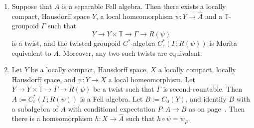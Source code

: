 \documentclass[12pt,a4paper]{amsart}
\newcommand{\field}[1]{\mathbb{#1}}
\newcommand{\TT}{\field{T}}
\newcommand{\red}{\operatorname{r}}
\newcommand{\tgcsa}[2]{\ensuremath{C^*_{\red}(#1 ; #2)}}
\begin{document}
\begin{thm}\label{thm-main}
\begin{enumerate}
\item  Suppose that $A$ is a separable Fell algebra.  Then
    there exists a locally compact, Hausdorff space $Y$, a
    local homeomorphism $\psi:Y\to\widehat A$ and a
    $\TT$-groupoid $\Gamma$ such that
    \[
    Y\to Y\times\TT\to\Gamma\to R(\psi)
    \]
is a twist, and the twisted groupoid  $C^*$-algebra
\tgcsa{\Gamma}{R(\psi)}  is Morita equivalent to  $A$.
Moreover, any two such twists are equivalent.
\item Let $Y$ be a locally compact, Hausdorff space, $X$ a
    locally compact, locally Hausdorff space, and $\psi:Y\to
    X$ a local homeomorphism. Let $Y\to Y \times \TT \to
    \Gamma \to R(\psi)$ be a twist such that $\Gamma$ is
    second-countable. Then $A := \tgcsa{\Gamma}{R(\psi)}$ is
    a Fell algebra. Let $B := C_0(Y)$, and identify $B$ with
    a subalgebra of $A$ with conditional expectation $P : A
    \to B$ as on page~\pageref{pg:tgcsa outline}. Then there
    is a homeomorphism $h : X \to \widehat{A}$ such that $h
    \circ \psi =  \psi_P$.
\end{enumerate}
\end{thm}
\end{document}

